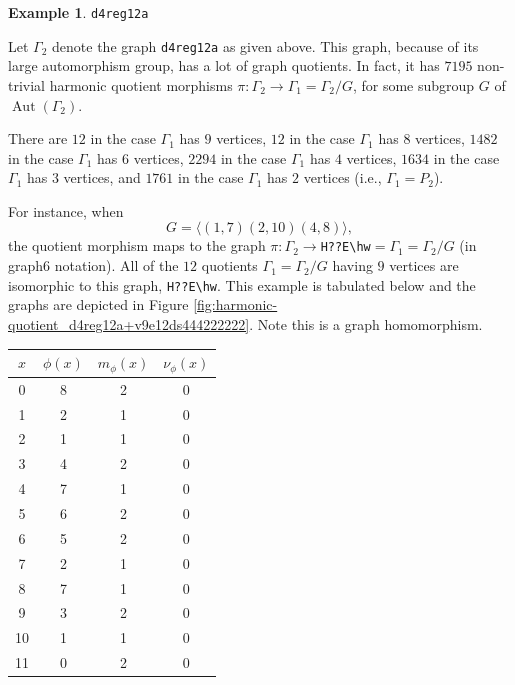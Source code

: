 \documentclass[12pt,letterpaper]{article}
\theoremstyle{definition}
\newtheorem{example}[theorem]{Example}
\DeclareMathOperator{\Aut}{Aut}
\begin{document}
\begin{example}%
\label{example:d4reg12a}  
 {\tt d4reg12a}\newline
{\rm  
Let $\Gamma_2$ denote the graph {\tt d4reg12a} as given above.
This graph, because of its large automorphism group, has a lot of
graph quotients. In fact, it has
$7195$  non-trivial harmonic quotient morphisms
$\pi: \Gamma_2\to \Gamma_1=\Gamma_2/G$,
for some subgroup $G$ of $\Aut(\Gamma_2)$.

There are $12$ in the case $\Gamma_1$ has $9$ vertices,
$12$ in the case $\Gamma_1$ has $8$ vertices,
$1482$ in the case $\Gamma_1$ has $6$ vertices,
$2294$ in the case $\Gamma_1$ has $4$ vertices,
$1634$ in the case $\Gamma_1$ has $3$ vertices,
and  $1761$ in the case $\Gamma_1$ has $2$ vertices
(i.e., $\Gamma_1=P_2$).

For instance, when
\[
G = \langle  (1,7)(2,10)(4,8) \rangle ,
\]
the quotient morphism maps to the graph
$\pi: \Gamma_2\to $\verb+H??E\hw+$=\Gamma_1=\Gamma_2/G $ (in graph6 notation).
All of the $12$ quotients $\Gamma_1=\Gamma_2/G$ having $9$ vertices
are isomorphic to this graph, \verb+H??E\hw+.
This example
is tabulated below and the graphs are depicted in
Figure \ref{fig:harmonic-quotient_d4reg12a+v9e12ds444222222}. 
Note this is a graph homomorphism.

\begin{center}
\begin{tabular}{c|c|c|c}  
  $x$ & $\phi(x)$ & $m_\phi(x)$ & $\nu_\phi(x)$ \\ \hline
  0   &    8   &        2         &  0   \\ 
  1   &    2   &        1         &  0  \\ 
  2   &    1   &        1         &  0  \\ 
  3   &    4   &        2         &  0  \\ 
  4   &    7   &        1         &  0   \\
  5   &    6   &        2         &  0   \\
  6   &    5   &        2         &  0   \\
  7   &    2   &        1         &  0   \\
  8   &    7   &        1         &  0   \\
  9   &    3   &        2         &  0   \\
  10   &   1   &        1         &  0  \\   
  11   &   0   &        2         &  0  \\
\end{tabular}
\end{center}

}
\end{example}
\end{document}
